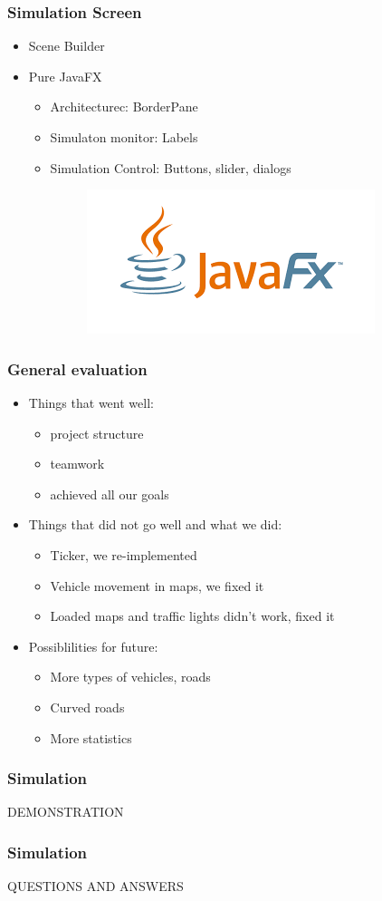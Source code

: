 \documentclass{beamer}
\begin{document}
\begin{frame}
\frametitle{Simulation Screen}
\begin{itemize}
\item Scene Builder
\item Pure JavaFX 
\begin{itemize}
\item Architecturec: BorderPane
\item Simulaton monitor: Labels
\item Simulation Control: Buttons, slider, dialogs
\begin{figure}[h]
\includegraphics[scale=.35]{JavaFX}
\end{figure}

\end{itemize}
\end{itemize}
\end{frame}

\begin{frame}
\frametitle {General evaluation}
\begin{itemize}
\item Things that went well:
\begin{itemize}
\item project structure
\item teamwork
\item achieved all our goals
\end{itemize}
\item Things that did not go well and what we did:
\begin{itemize}
\item  Ticker, we re-implemented
\item Vehicle movement in maps, we fixed it
\item Loaded maps and traffic lights didn't work, fixed it

\end{itemize}
\item Possiblilities for future:
\begin{itemize}
\item More types of vehicles, roads
\item Curved roads
\item More statistics
\end{itemize}
\end{itemize}

\end{frame}

\begin{frame}
\frametitle {Simulation}
\begin{center}
DEMONSTRATION
\end{center}
\end{frame}

\begin{frame}
\frametitle {Simulation}
\begin{center}
QUESTIONS AND ANSWERS
\end{center}
\end{frame}
\end{document}
